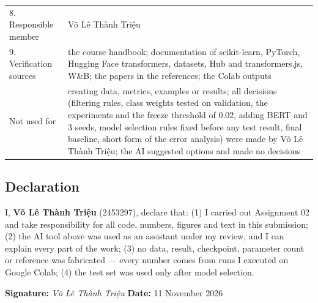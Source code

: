 \documentclass[11pt,a4paper]{article}
\begin{document}
\begin{table}[H]
\begin{tabularx}{\textwidth}{@{}p{3.3cm}L@{}}
8. Responsible member & Võ Lê Thành Triệu\\
9. Verification sources & the course handbook; documentation of scikit-learn, PyTorch, Hugging Face transformers, datasets, Hub and transformers.js, W\&B; the papers in the references; the Colab outputs\\
\midrule
Not used for & creating data, metrics, examples or results; all decisions (filtering rules, class weights tested on validation, the experiments and the freeze threshold of 0.02, adding BERT and 3 seeds, model selection rules fixed before any test result, final baseline, short form of the error analysis) were made by Võ Lê Thành Triệu; the AI suggested options and made no decisions\\
\bottomrule
\end{tabularx}
\end{table}

\subsection{Declaration}
I, \textbf{Võ Lê Thành Triệu} (2453297), declare that: (1) I carried out Assignment 02 and take responsibility for all code, numbers, figures and text in this submission; (2) the AI tool above was used as an assistant under my review, and I can explain every part of the work; (3) no data, result, checkpoint, parameter count or reference was fabricated --- every number comes from runs I executed on Google Colab; (4) the test set was used only after model selection.

\vspace{0.4cm}
\noindent\textbf{Signature:} \emph{Võ Lê Thành Triệu} \hfill \textbf{Date:} 11 November 2026
\end{document}
